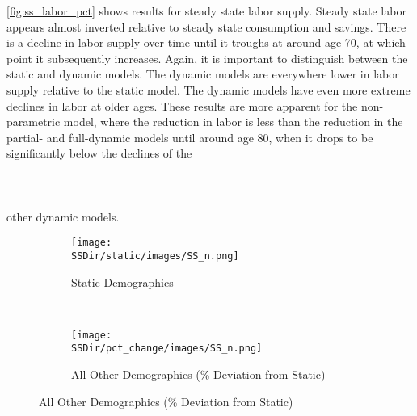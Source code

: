 \documentclass[10pt]{article}
\numberwithin{equation}{subsection}
\newcommand*{\SSDir}{../../code/Rick/OUTPUT/SS}
\begin{document}
\par \autoref{fig:ss_labor_pct} shows results for steady state labor supply. Steady state labor appears almost inverted relative to steady state consumption and savings. There is a decline in labor supply over time until it troughs at around age 70, at which point it subsequently increases. Again, it is important to distinguish between the static and dynamic models. The dynamic models are everywhere lower in labor supply relative to the static model. The dynamic models have even more extreme declines in labor at older ages. These results are more apparent for the non-parametric model, where the reduction in labor is less than the reduction in the partial- and full-dynamic models until around age 80, when it drops to be significantly below the declines of the
\\\\\\\\
other dynamic models.

\begin{figure}[!ht]
   \caption{\label{fig:ss_labor_pct}Steady State Labor Supply}
   \begin{subfigure}{0.5\textwidth}
      \centering
      \texttt{[image: \\SSDir/static/images/SS\_n.png]}
      \caption{Static Demographics}
   \end{subfigure}%
   ~
   \begin{subfigure}{0.5\textwidth}
      \centering
      \texttt{[image: \\SSDir/pct\_change/images/SS\_n.png]}
      \caption{All Other Demographics (\% Deviation from Static)}
   \end{subfigure}
\end{figure}

\end{document}
